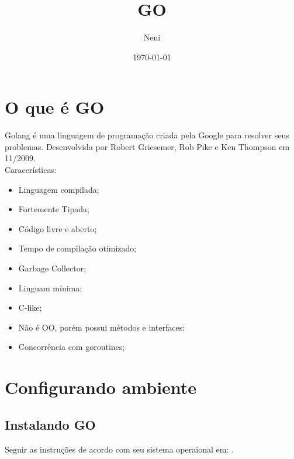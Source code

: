 \documentclass{apostila}
\title{GO}
\author{Neni}
\date{\today}
\begin{document}
\chapter{O que é GO}
\begin{flushleft}

    Golang é uma linguagem de programação criada pela Google para resolver seus problemas\cite[1]{cod3r}. Desenvolvida por Robert Griesemer, Rob Pike e Ken Thompson em 11/2009\cite[4]{cod3r}.
    \\
    Caracerísticas:
    \begin{itemize}
        \item Linguagem compilada\cite[1]{cod3r};
        \item Fortemente Tipada\cite[4]{cod3r};
        \item Código livre e aberto\cite[4]{cod3r};
        \item Tempo de compilação otimizado\cite[4]{cod3r};
        \item Garbage Collector\cite[4]{cod3r};
        \item Linguam mínima\cite[4]{cod3r};
        \item C-like\cite[4]{cod3r};
        \item Não é OO, porém possui métodos e interfaces\cite[4]{cod3r};
        \item Concorrência com goroutines\cite[4]{cod3r};
    \end{itemize}
\end{flushleft}










\chapter{Configurando ambiente}
\section{Instalando GO}
Seguir as instruções de acordo com seu sistema operaional em: .
\end{document}
